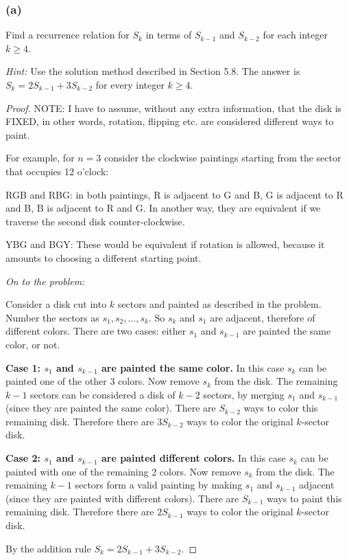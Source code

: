 \documentclass[14pt]{extarticle}
\begin{document}
\subsubsection{(a)}
Find a recurrence relation for \(S_k\) in terms of \(S_{k-1}\) and \(S_{k-2}\) for each integer \(k \geq 4\).

{\it Hint:} Use the solution method described in Section 5.8. The answer is \(S_k = 2S_{k-1} + 3S_{k-2}\) for every 
integer \(k \geq 4\).

\begin{proof}
NOTE: I have to assume, without any extra information, that the disk is FIXED, in other words, rotation, flipping etc.
are considered different ways to paint.

For example, for \(n=3\) consider the clockwise paintings starting from the sector that occupies 12 o'clock: 

RGB and RBG: in both paintings, R is adjacent to G and B, G is adjacent to R and B, B is adjacent to R and G. In 
another way, they are equivalent if we traverse the second disk counter-clockwise.

YBG and BGY: These would be equivalent if rotation is allowed, because it amounts to choosing a different starting point.

{\it On to the problem:}

Consider a disk cut into \(k\) sectors and painted as described in the problem. Number the sectors as \(s_1, s_2, 
\ldots, s_k\). So \(s_k\) and \(s_1\) are adjacent, therefore of different colors. There are two cases: either 
\(s_1\) and \(s_{k-1}\) are painted the same color, or not.

{\bf Case 1: \(s_1\) and \(s_{k-1}\) are painted the same color.} In this case \(s_k\) can be painted one of the 
other 3 colors. Now remove \(s_k\) from the disk. The remaining \(k-1\) sectors can be considered a disk of 
\(k-2\) sectors, by merging \(s_1\) and \(s_{k-1}\) (since they are painted the same color). There are \(S_{k-2}\) 
ways to color this remaining disk. Therefore there are \(3S_{k-2}\) ways to color the original \(k\)-sector disk.

{\bf Case 2: \(s_1\) and \(s_{k-1}\) are painted different colors.} In this case \(s_k\) can be painted with one of 
the remaining 2 colors. Now remove \(s_k\) from the disk. The remaining \(k-1\) sectors form a valid painting by 
making \(s_1\) and \(s_{k-1}\) adjacent (since they are painted with different colors). There are \(S_{k-1}\) ways 
to paint this remaining disk. Therefore there are \(2S_{k-1}\) ways to color the original \(k\)-sector disk.

By the addition rule \(S_k = 2S_{k-1} + 3S_{k-2}\).
\end{proof}
\end{document}
